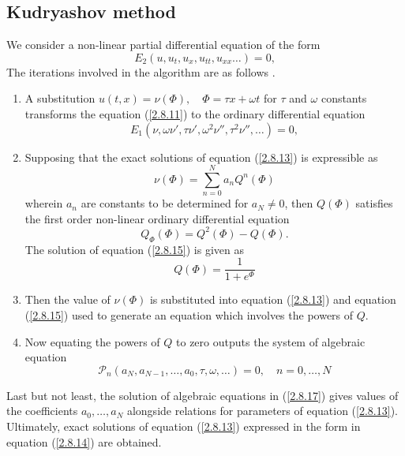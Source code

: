 \begin{defn}
\subsection{Kudryashov method}
We  consider a non-linear partial differential equation of the form
\begin{equation}
E_{2}(u,u_{t}, u_{x}, u_{tt},u_{xx} \ldots) =0,  \label{2.8.11}
\end{equation}
The iterations involved in the algorithm are as follows  \citep{kudryashov2012one}.
\begin{enumerate}[o]
\item A substitution $u(t,x) = \nu(\varPhi), \quad \varPhi =  \tau x+\omega t$ for $\tau$ and $\omega$  constants transforms the equation (\ref{2.8.11}) to the ordinary differential equation
\begin{equation} E_{1}(\nu,\omega \nu', \tau \nu',\omega^2\nu'', \tau^2 \nu'', \ldots) =0,  \label{2.8.13}
\end{equation}
\item Supposing that the exact solutions of equation (\ref{2.8.13}) is expressible as \begin{equation}
\nu(\varPhi) = \sum_{ n=0}^{N} a_n \textit{Q}^n(\varPhi) \label{2.8.14}
\end{equation} wherein $a_n$ are constants to be determined for $a_N \neq 0$, then $\textit{Q}(\varPhi)$ satisfies the first order non-linear ordinary differential equation \begin{equation}\textit{Q}_{\varPhi} ( \varPhi) =\textit{Q}^2(\varPhi) -\textit{Q}(\varPhi). \label{2.8.15}
\end{equation}
The solution of equation (\ref{2.8.15}) is given as \begin{equation}\textit{Q}(\varPhi) = \frac{1}{ 1 + e^{\varPhi}} \label{2.8.16}
\end{equation}
\item Then the value of $\nu(\varPhi)$ is substituted into equation (\ref{2.8.13})	 and equation (\ref{2.8.15}) used to generate an equation which involves the powers of $\textit{Q}$.
\item Now equating the powers of $\textit{Q}$ to zero outputs the system of algebraic equation 
\begin{equation}\mathcal{P}_n ( a_N,a_{N-1},\ldots,a_0,\tau,\omega , \ldots) =0, \quad n= 0, \ldots, N \label{2.8.17}
\end{equation}
\end{enumerate}
\begin{rem} Last but not least, the solution of algebraic equations in (\ref{2.8.17}) gives values of the coefficients $a_0,\ldots,a_N$ alongside relations for parameters of equation (\ref{2.8.13}). Ultimately, exact solutions of equation (\ref{2.8.13})  expressed in the form in equation (\ref{2.8.14}) are obtained.
\end{rem}

\end{defn}
